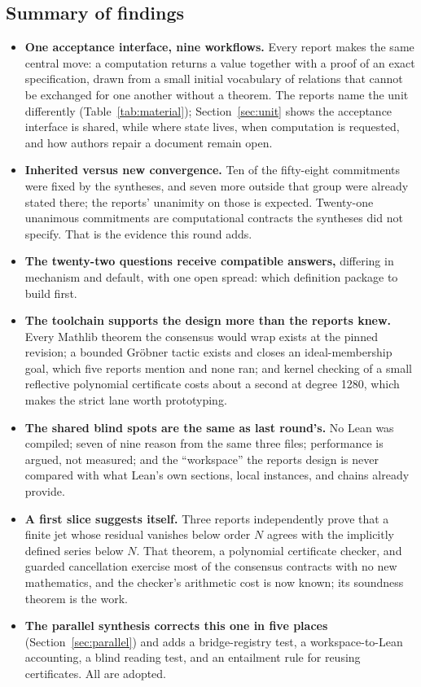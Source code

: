\documentclass[11pt,a4paper]{article}
\newcommand{\code}[1]{\texttt{\detokenize{#1}}}
\theoremstyle{definition}
\begin{document}
\subsection{Summary of findings}
\begin{itemize}
\item \textbf{One acceptance interface, nine workflows.} Every report makes the same central move: a computation returns a value together with a proof of an exact specification, drawn from a small initial vocabulary of relations that cannot be exchanged for one another without a theorem. The reports name the unit differently (Table~\ref{tab:material}); Section~\ref{sec:unit} shows the acceptance interface is shared, while where state lives, when computation is requested, and how authors repair a document remain open.
\item \textbf{Inherited versus new convergence.} Ten of the fifty-eight commitments were fixed by the syntheses, and seven more outside that group were already stated there; the reports' unanimity on those is expected. Twenty-one unanimous commitments are computational contracts the syntheses did not specify. That is the evidence this round adds.
\item \textbf{The twenty-two questions receive compatible answers,} differing in mechanism and default, with one open spread: which definition package to build first.
\item \textbf{The toolchain supports the design more than the reports knew.} Every Mathlib theorem the consensus would wrap exists at the pinned revision; a bounded Gr\"obner tactic exists and closes an ideal-membership goal, which five reports mention and none ran; and kernel checking of a small reflective polynomial certificate costs about a second at degree 1280, which makes the strict lane worth prototyping.
\item \textbf{The shared blind spots are the same as last round's.} No Lean was compiled; seven of nine reason from the same three files; performance is argued, not measured; and the ``workspace'' the reports design is never compared with what Lean's own sections, local instances, and \code{have} chains already provide.
\item \textbf{A first slice suggests itself.} Three reports independently prove that a finite jet whose residual vanishes below order $N$ agrees with the implicitly defined series below $N$. That theorem, a polynomial certificate checker, and guarded cancellation exercise most of the consensus contracts with no new mathematics, and the checker's arithmetic cost is now known; its soundness theorem is the work.
\item \textbf{The parallel synthesis corrects this one in five places} (Section~\ref{sec:parallel}) and adds a bridge-registry test, a workspace-to-Lean accounting, a blind reading test, and an entailment rule for reusing certificates. All are adopted.
\end{itemize}
\end{document}
